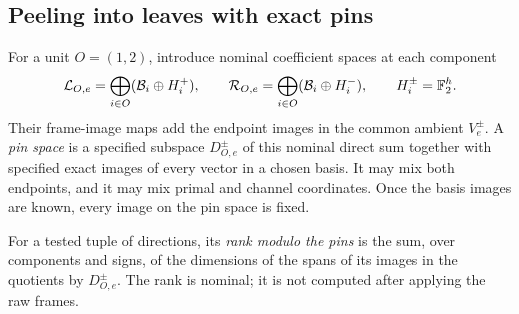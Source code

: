 \subsection{Peeling into leaves with exact pins}

For a unit \(O=(1,2)\), introduce nominal coefficient spaces at each component
\[
 \mathcal L_{O,e}
   =\bigoplus_{i\in O}(\mathcal B_i\oplus H_i^+),
 \qquad
 \mathcal R_{O,e}
   =\bigoplus_{i\in O}(\mathcal B_i\oplus H_i^-),
 \qquad H_i^\pm=\mathbb F_2^h.
\]
Their frame-image maps add the endpoint images in the common ambient \(V_e^\pm\).
A \emph{pin space} is a specified subspace \(D_{O,e}^\pm\) of this nominal direct sum together with specified exact images of every vector in a chosen basis.
It may mix both endpoints, and it may mix primal and channel coordinates.
Once the basis images are known, every image on the pin space is fixed.

For a tested tuple of directions, its \emph{rank modulo the pins} is the sum, over components and signs, of the dimensions of the spans of its images in the quotients by \(D_{O,e}^\pm\).
The rank is nominal; it is not computed after applying the raw frames.

